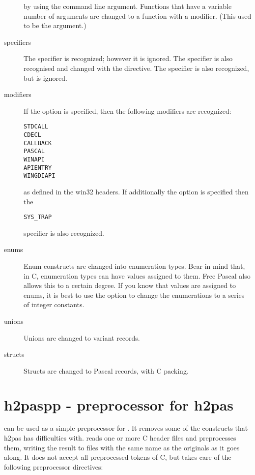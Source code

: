 \begin{description}
by using the  command line argument. Functions that have a
variable number of arguments are changed to a function with a 
modifier. (This used to be the  argument.)
\item[specifiers]
The  specifier is recognized; however it is ignored.
The  specifier is also recognised and changed with the
 directive. The  specifier is also
recognized, but is ignored.
\item[modifiers]
If the  option is specified, then the following modifiers are recognized:
\begin{verbatim}
STDCALL
CDECL
CALLBACK
PASCAL
WINAPI
APIENTRY
WINGDIAPI
\end{verbatim}
as defined in the win32 headers. If additionally the 
option is specified then the
\begin{verbatim}
SYS_TRAP
\end{verbatim}
specifier is also recognized.
\item[enums]
Enum constructs are changed into enumeration types. Bear in mind that, in C,
enumeration types can have values assigned to them. Free Pascal also allows
this to a certain degree. If you know that values are assigned to enums, it
is best to use the  option to change the enumerations to a series of
integer  constants.

\item[unions] Unions are changed to variant records.
\item[structs] Structs are changed to Pascal records, with C packing.
\end{description}

\section{h2paspp - preprocessor for h2pas}
 can be used as a simple preprocessor for . It
removes some of the constructs that h2pas has difficulties with.
 reads one or more C header files and preprocesses them, writing the result
to files with the same name as the originals as it goes along.
It does not accept all preprocessed tokens of C, but takes care of the following
preprocessor directives:

